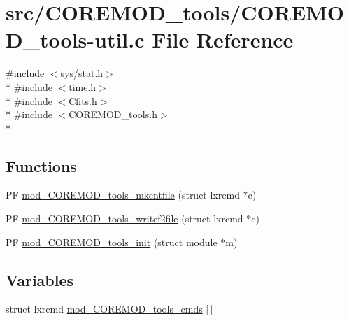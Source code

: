 \hypertarget{COREMOD__tools-util_8c}{\section{src/\+C\+O\+R\+E\+M\+O\+D\+\_\+tools/\+C\+O\+R\+E\+M\+O\+D\+\_\+tools-\/util.c File Reference}
\label{COREMOD__tools-util_8c}
}
{\ttfamily \#include $<$sys/stat.\+h$>$}\\*
{\ttfamily \#include $<$time.\+h$>$}\\*
{\ttfamily \#include $<$Cfits.\+h$>$}\\*
{\ttfamily \#include $<$C\+O\+R\+E\+M\+O\+D\+\_\+tools.\+h$>$}\\*
\subsection*{Functions}
\begin{DoxyCompactItemize}
\item 
P\+F \hyperlink{COREMOD__tools-util_8c_a06f48d4a86a2fdc9584bf9dc2327e489}{mod\+\_\+\+C\+O\+R\+E\+M\+O\+D\+\_\+tools\+\_\+mkcntfile} (struct lxrcmd $\ast$c)
\item 
P\+F \hyperlink{COREMOD__tools-util_8c_ac71b29b59c1655b692adec27db89a5dd}{mod\+\_\+\+C\+O\+R\+E\+M\+O\+D\+\_\+tools\+\_\+writef2file} (struct lxrcmd $\ast$c)
\item 
P\+F \hyperlink{COREMOD__tools-util_8c_aa4a40bdadb3c1cfa417640f3cee38a62}{mod\+\_\+\+C\+O\+R\+E\+M\+O\+D\+\_\+tools\+\_\+init} (struct module $\ast$m)
\end{DoxyCompactItemize}
\subsection*{Variables}
\begin{DoxyCompactItemize}
\item 
struct lxrcmd \hyperlink{COREMOD__tools-util_8c_adcd4eaaac246d65e6d23ad5e6f5d411d}{mod\+\_\+\+C\+O\+R\+E\+M\+O\+D\+\_\+tools\+\_\+cmds} \mbox{[}$\,$\mbox{]}
\end{DoxyCompactItemize}


